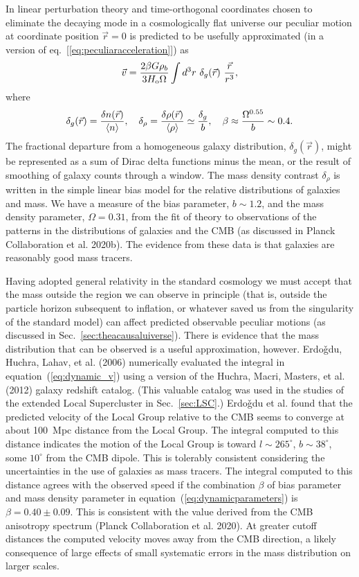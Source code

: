 \documentclass[fleqn,usenatbib]{mnras}
\begin{document}
In linear perturbation theory and time-orthogonal coordinates chosen to eliminate the decaying mode in a cosmologically flat universe our peculiar motion at coordinate position $\vec r=0$ is predicted to be usefully approximated (in a version of eq.~[\ref{eq:peculiaracceleration}]) as 
\begin{equation}
\vec v = {2\beta G \rho_b\over 3 H_{\rm o}\Omega}\int d^3r~\delta_g(\vec r)~{\vec r\over r^3},\label{eq:dynamic_v}
\end{equation}
where
\begin{equation}
\delta_g(\vec r) = {\delta n(\vec r)\over\langle n\rangle},\quad
\delta_\rho={\delta\rho(\vec r)\over\langle\rho\rangle}\simeq{\delta_g\over b},\quad  \beta \approx {\Omega^{0.55}\over b}\sim 0.4.\label{eq:dynamicparameters}
\end{equation}
The fractional departure from a homogeneous galaxy distribution, $\delta_g(\vec r)$, might be represented as a sum of Dirac delta functions minus the mean, or the result of smoothing of galaxy counts through a window. The  mass density contrast $\delta_\rho$ is written in the simple linear bias model for the relative distributions of galaxies and mass. We have a measure of the bias parameter, $b\sim 1.2$, and the mass density parameter, $\Omega=0.31$, from the fit of theory to observations of the patterns in the distributions of galaxies and the CMB (as discussed in Planck Collaboration et al. 2020b). The evidence from these data is that galaxies are reasonably good mass tracers. 

Having adopted general relativity in the standard cosmology we must accept that the mass outside the region we can observe in principle (that is, outside the particle horizon subsequent to inflation, or whatever saved us from the singularity of the standard model) can affect predicted observable peculiar motions (as discussed in Sec.~\ref{sec:theacausaluiverse}). There is evidence that the mass distribution that can be observed is a useful approximation, however. Erdo{\v{g}}du, Huchra, Lahav, et al. (2006) numerically evaluated the integral in equation~(\ref{eq:dynamic_v}) using a version of the Huchra, Macri, Masters, et al. (2012) galaxy redshift catalog. (This valuable catalog was used in the studies of the extended Local Supercluster in Sec.~\ref{sec:LSC}.) Erdo{\v{g}}du et al. found that the predicted velocity of the Local Group relative to the CMB seems to converge at about 100~Mpc distance from the Local Group. The integral computed to this distance indicates the motion of the Local Group is toward $l\sim 265^\circ$, $b\sim 38^\circ$, some $10^\circ$ from the CMB dipole. This is tolerably consistent considering the uncertainties in the use of galaxies as mass tracers. The integral computed to this distance agrees with the observed speed if the combination $\beta$ of bias parameter and mass density parameter in equation~(\ref{eq:dynamicparameters}) is $\beta = 0.40\pm 0.09$. This is consistent with the value derived from the CMB anisotropy spectrum (Planck Collaboration et al. 2020). At greater cutoff distances the computed velocity moves away from the CMB direction, a likely consequence of large effects of small systematic errors in the mass distribution on larger scales.
\end{document}
